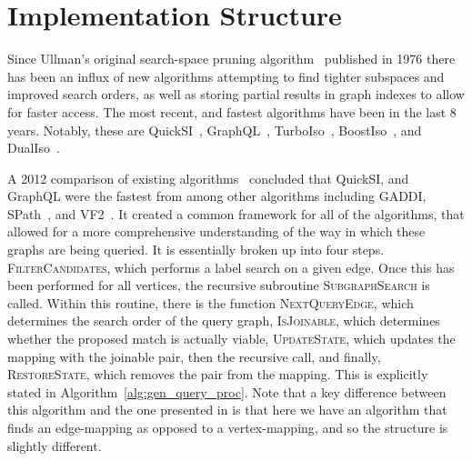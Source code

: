 \section{Implementation Structure}
\label{sec:structure}

Since Ullman's original search-space pruning algorithm~\cite{1976-ACMJ-Ullman}
published in 1976 there has been an influx of new algorithms attempting to find
tighter subspaces and improved search orders, as well as storing partial results
in graph indexes to allow for faster access.  The most recent, and fastest
algorithms have been in the last 8 years. Notably, these are
QuickSI~\cite{2008-VLDB-QuickSI}, GraphQL~\cite{2008-SIGMOD-GraphQL},
TurboIso~\cite{2013-SIGMOD-TurboISO}, BoostIso~\cite{2015-VLDB-BoostIso}, and
DualIso~\cite{2014-IEEE-DualIso}.

A 2012 comparison of existing algorithms~\cite{2012-VLDB-IsoSurvey} concluded
that QuickSI, and GraphQL were the fastest from among other algorithms including
GADDI, SPath~\cite{2010-VLDB-SPath}, and VF2~\cite{2004-PAMI-VF2}. It created a
common framework for all of the algorithms, that allowed for a more
comprehensive understanding of the way in which these graphs are being
queried. It is essentially broken up into four steps. \textsc{FilterCandidates},
which performs a label search on a given edge.  Once this has been performed
for all vertices, the recursive subroutine \textsc{SubgraphSearch} is
called. Within this routine, there is the function \textsc{NextQueryEdge},
which determines the search order of the query graph, \textsc{IsJoinable}, which
determines whether the proposed match is actually viable, \textsc{UpdateState},
which updates the mapping with the joinable pair, then the recursive call, and
finally, \textsc{RestoreState}, which removes the pair from the mapping. This is
explicitly stated in Algorithm~\ref{alg:gen_query_proc}. Note that a key
difference between this algorithm and the one presented in
\cite{2012-VLDB-IsoSurvey} is that here we have an algorithm that finds an
edge-mapping as opposed to a vertex-mapping, and so the structure is slightly
different. 

